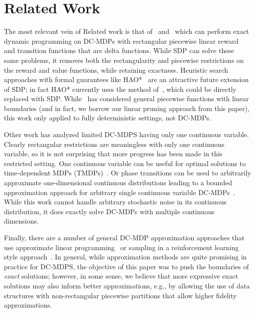 \section{Related Work}
The most relevant vein of Related work is that of~\cite{feng04}
and~\cite{li05} which can perform exact dynamic programming on
DC-MDPs with rectangular piecewise linear reward and transition functions
that are delta functions.  While SDP can solve these same problems,
it removes both the rectangularity and piecewise restrictions on the
reward and value functions, while
retaining exactness.  
Heuristic search approaches with formal guarantees 
like HAO*~\cite{hao09} are an attractive future extension of SDP;
in fact HAO* currently uses the method of~\cite{feng04}, which could
be directly replaced with SDP.  While~\cite{penberthy94} has considered
general piecewise functions with linear boundaries (and in fact,
we borrow our linear pruning approach from this paper), this work
only applied to fully deterministic settings, not DC-MDPs.

Other work has analyzed limited DC-MDPS having only one continuous
variable.  Clearly rectangular restrictions are meaningless with
only one continuous variable, so it is not surprising that more
progress has been made in this restricted setting.  One continuous
variable can be useful for optimal solutions to time-dependent MDPs 
(TMDPs)~\cite{boyan01}.  Or phase transitions can be used to 
arbitrarily approximate one-dimensional continuous distributions
leading to a bounded approximation approach for arbitrary single continuous
variable DC-MDPs~\cite{phase07}.  
While this work cannot handle arbitrary stochastic
noise in its continuous distribution, it does exactly solve DC-MDPs
with multiple continuous dimensions.

Finally, there are a number of general DC-MDP approximation
approaches that use approximate linear programming~\cite{kveton06}
or sampling in a reinforcement learning style approach~\cite{munos02}.
In general, while approximation methods are quite promising in
practice for DC-MDPS, the objective of this paper was to push
the boundaries of \emph{exact} solutions; however, in some sense, 
we believe that more expressive exact solutions may also inform
better approximations, e.g., by allowing the use of data structures
with non-rectangular piecewise partitions that allow higher fidelity
approximations.
